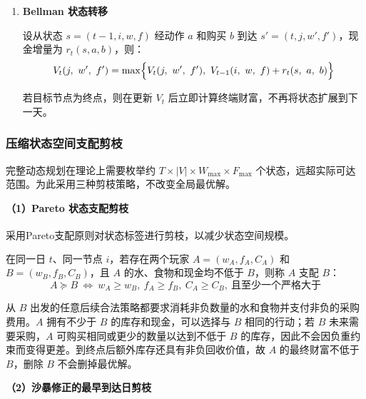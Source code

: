 \documentclass{cumcmthesis}
\numberwithin{equation}{section}
\numberwithin{figure}{section}
\numberwithin{table}{section}
\begin{document}
\begin{enumerate}
\begin{enumerate}
其中，$b^w_t$ 和 $b^f_t$ 为日末村庄购买量，非村庄节点处为零；${I}(\cdot)$ 为指示函数。

        \end{enumerate}

        \item\textbf{Bellman 状态转移}
        
        \hspace*{2em}设从状态 $s=(t-1,i,w,f)$ 经动作 $a$ 和购买 $b$ 到达 $s'=(t,j,w',f')$，现金增量为 $r_t(s,a,b)$，则：
\vspace{-10pt}
\begin{equation}
V_t(j,\ w',\ f') = \max\Bigl\{ V_t(j,\ w',\ f'),\ V_{t-1}(i,\ w,\ f) + r_t(s,\ a,\ b) \Bigr\}
\label{eq:q1_bellman}
\end{equation}

\hspace*{2em}若目标节点为终点，则在更新 $V_t$ 后立即计算终端财富，不再将状态扩展到下一天。
    \end{enumerate}
 \vspace{-5pt}   
\subsubsection{压缩状态空间支配剪枝}

完整动态规划在理论上需要枚举约 $T \times |V| \times W_{\max} \times F_{\max}$ 个状态，远超实际可达范围。为此采用三种剪枝策略，不改变全局最优解。

\textbf{（1）Pareto 状态支配剪枝}

采用Pareto支配原则对状态标签进行剪枝，以减少状态空间规模\textsuperscript{\cite{lichenghao2026}}。

在同一日 $t$、同一节点 $i$，若存在两个玩家 $A=(w_A,f_A,C_A)$ 和 $B=(w_B,f_B,C_B)$，且 $A$ 的水、食物和现金均不低于 $B$，则称 $A$ 支配 $B$：
 \vspace{-10pt} 
\begin{equation}
A \succcurlyeq B \ \Leftrightarrow\ w_A \geq w_B,\ f_A \geq f_B,\ C_A \geq C_B,\ \text{且至少一个严格大于}
\label{eq:dominate}
\end{equation}

从 $B$ 出发的任意后续合法策略都要求消耗非负数量的水和食物并支付非负的采购费用。$A$ 拥有不少于 $B$ 的库存和现金，可以选择与 $B$ 相同的行动；若 $B$ 未来需要采购，$A$ 可购买相同或更少的数量以达到不低于 $B$ 的库存，因此不会因负重约束而变得更差。到终点后额外库存还具有非负回收价值，故 $A$ 的最终财富不低于 $B$，删除 $B$ 不会删掉最优解。


\textbf{（2）沙暴修正的最早到达日剪枝}
\end{document}
